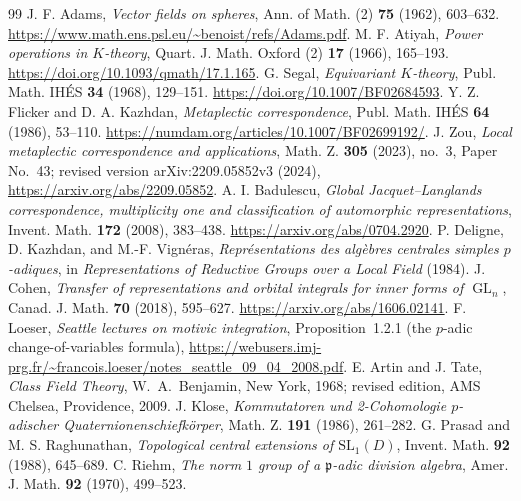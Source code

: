 \documentclass[11pt]{article}
\newcommand{\GL}{\operatorname{GL}}
\theoremstyle{plain}
\theoremstyle{definition}
\begin{document}
\begin{thebibliography}{99}
 J. F. Adams, \emph{Vector fields on spheres}, Ann. of Math.
(2) \textbf{75} (1962), 603--632.
\url{https://www.math.ens.psl.eu/~benoist/refs/Adams.pdf}.
 M. F. Atiyah, \emph{Power operations in $K$-theory},
Quart. J. Math. Oxford (2) \textbf{17} (1966), 165--193.
\url{https://doi.org/10.1093/qmath/17.1.165}.
 G. Segal, \emph{Equivariant $K$-theory},
Publ. Math. IH\'ES \textbf{34} (1968), 129--151.
\url{https://doi.org/10.1007/BF02684593}.
 Y. Z. Flicker and D. A. Kazhdan, \emph{Metaplectic correspondence}, Publ. Math. IH\'ES \textbf{64} (1986), 53--110. \url{https://numdam.org/articles/10.1007/BF02699192/}.
 J. Zou, \emph{Local metaplectic correspondence and applications}, Math. Z. \textbf{305} (2023), no.~3, Paper No.~43; revised version arXiv:2209.05852v3 (2024), \url{https://arxiv.org/abs/2209.05852}.
 A. I. Badulescu, \emph{Global Jacquet--Langlands correspondence, multiplicity one and classification of automorphic representations}, Invent. Math. \textbf{172} (2008), 383--438. \url{https://arxiv.org/abs/0704.2920}.
 P. Deligne, D. Kazhdan, and M.-F. Vign\'eras, \emph{Repr\'esentations des alg\`ebres centrales simples $p$-adiques}, in \emph{Representations of Reductive Groups over a Local Field} (1984).
 J. Cohen, \emph{Transfer of representations and orbital integrals for inner forms of $\GL_n$}, Canad. J. Math. \textbf{70} (2018), 595--627. \url{https://arxiv.org/abs/1606.02141}.
 F. Loeser, \emph{Seattle lectures on motivic integration},
Proposition~1.2.1 (the $p$-adic change-of-variables formula),
\url{https://webusers.imj-prg.fr/~francois.loeser/notes_seattle_09_04_2008.pdf}.
 E. Artin and J. Tate, \emph{Class Field Theory}, W.~A.~Benjamin, New York, 1968; revised edition, AMS Chelsea, Providence, 2009.
 J. Klose, \emph{Kommutatoren und 2-Cohomologie $p$-adischer Quaternionenschiefk\"orper}, Math. Z. \textbf{191} (1986), 261--282.
 G. Prasad and M. S. Raghunathan, \emph{Topological central extensions of $\mathrm{SL}_1(D)$}, Invent. Math. \textbf{92} (1988), 645--689.
 C. Riehm, \emph{The norm $1$ group of a $\mathfrak p$-adic division algebra}, Amer. J. Math. \textbf{92} (1970), 499--523.
\end{thebibliography}
\end{document}
